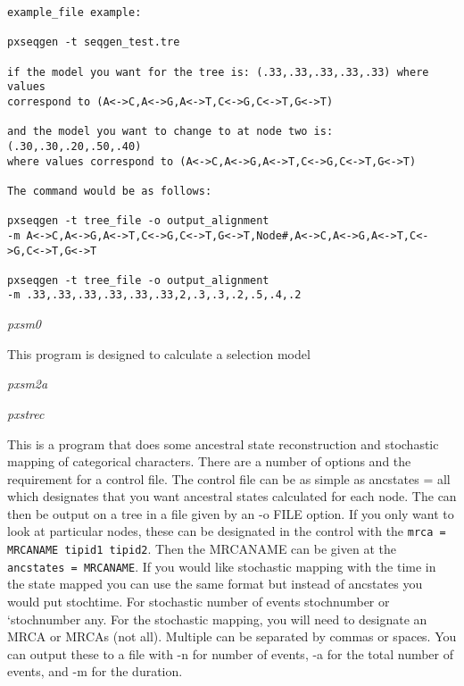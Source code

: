 \documentclass[12pt,letterpaper]{article}
\renewcommand{\subsection}[1]{%
\bigskip
\begin{center}
\begin{large}
\normalfont\itshape #1
\end{large}
\end{center}}
\begin{document}
\begin{flushleft}
\begin{verbatim}
example_file example:

pxseqgen -t seqgen_test.tre

if the model you want for the tree is: (.33,.33,.33,.33,.33) where values 
correspond to (A<->C,A<->G,A<->T,C<->G,C<->T,G<->T)

and the model you want to change to at node two is: (.30,.30,.20,.50,.40)
where values correspond to (A<->C,A<->G,A<->T,C<->G,C<->T,G<->T)

The command would be as follows: 

pxseqgen -t tree_file -o output_alignment 
-m A<->C,A<->G,A<->T,C<->G,C<->T,G<->T,Node#,A<->C,A<->G,A<->T,C<->G,C<->T,G<->T

pxseqgen -t tree_file -o output_alignment 
-m .33,.33,.33,.33,.33,.33,2,.3,.3,.2,.5,.4,.2
\end{verbatim}
\end{flushleft}

\subsection{pxsm0}

This program is designed to calculate a selection model

\subsection{pxsm2a}

\subsection{pxstrec}

This is a program that does some ancestral state reconstruction and stochastic mapping of categorical characters. There are a number of options and the requirement for a control file. The control file can be as simple as ancstates = all which designates that you want ancestral states calculated for each node. The can then be output on a tree in a file given by an -o FILE option. If you only want to look at particular nodes, these can be designated in the control with the \texttt{mrca = MRCANAME tipid1 tipid2}. Then the MRCANAME can be given at the \texttt{ancstates = MRCANAME}. If you would like stochastic mapping with the time in the state mapped you can use the same format but instead of ancstates you would put stochtime. For stochastic number of events stochnumber or `stochnumber any. For the stochastic mapping, you will need to designate an MRCA or MRCAs (not all). Multiple can be separated by commas or spaces. You can output these to a file with -n for number of events, -a for the total number of events, and -m for the duration. 
\end{document}
